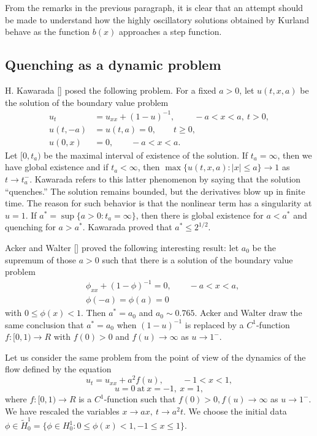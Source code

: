 \documentclass{surv-l}
\theoremstyle{plain}
\theoremstyle{definition}
\numberwithin{equation}{section}
\numberwithin{figure}{chapter}
\begin{document}
From the remarks in the previous paragraph, it is clear that an attempt should be made to understand how the highly oscillatory solutions obtained by Kurland behave as the function $b(x)$ approaches a step function.

\subsection{Quenching as a dynamic problem}\label{subsec4.3.9} H. Kawarada [\citeyear{1975k}] posed the following problem. For a fixed $a>0$, let $u(t,x,a)$ be the solution of the boundary value problem
\begin{align*}
u_{t}&=u_{xx}+(1-u)^{-1},\qquad\ -a<x<a,\ t>0,\\
u(t,-a)&=u(t,a)=0,\qquad t\geq 0,\\
u(0,x)&=0,\qquad -a<x<a.
\end{align*}
Let $[0,t_{a})$ be the maximal interval of existence of the solution. If $ t_{a}=\infty$, then we have global existence and if $ t_{a}<\infty$, then $\max\{u(t,x,a)\!:|x|\leq a\}\rightarrow 1$ as $t\rightarrow t_{a}^{-}$. Kawarada refers to this latter phenomenon by saying that the solution ``quenches.'' The solution remains bounded, but the derivatives blow up in finite time. The reason for such behavior is that the nonlinear term has a singularity at $u=1$. If $a^{\ast}=\sup\{a>0\!:t_{a}=\infty\}$, then there is global existence for $a<a^{\ast}$ and quenching for $a>a^{\ast}$. Kawarada proved that $a^{\ast}\leq 2^{1/2}$.

Acker and Walter [\citeyear{1976aw}] proved the following interesting result: let $a_{0}$ be the supremum of those $a>0$ such that there is a solution of the boundary value problem
\begin{align*}
&\phi_{xx}+(1-\phi)^{-1}=0,\qquad -a<x<a,\\
&\phi(-a)=\phi(a)=0
\end{align*}
with $0\leq\phi(x)<1$. Then $a^{\ast}=a_{0}$ and $a_{0}\sim 0.765$. Acker and Walter draw the same conclusion that $a^{\ast}=a_{0}$ when $(1-u)^{-1}$ is replaced by a $C^{1}$-function $f\!:[0,1)\rightarrow R$ with $f(0)>0$ and $ f(u)\rightarrow\infty$ as $u\rightarrow 1^{-}$.

Let us consider the same problem from the point of view of the dynamics of the flow defined by the equation
\begin{equation}\label{chap04:eq3.50}
u_{t}=u_{xx}+a^{2}f(u),\qquad\, -1<x<1,
\end{equation}
\begin{equation}\label{chap04:eq3.51}
u=0\ \mathrm{at}\ x=-1,\ x=1,
\end{equation}
where $f\!:[0,1)\rightarrow R$ is a $C^{1}$-function such that $f(0)>0,f(u)\rightarrow\infty$ as $u\rightarrow 1^{-}$. We have rescaled the variables $x\rightarrow ax,\ t\rightarrow a^{2}t$. We choose the initial data $\phi \in\tilde{H}_{0}^{1}=\{\phi\in H_{0}^{1}\!:0\leq\phi(x)<1,-1\leq x\leq 1\}$.
\end{document}
